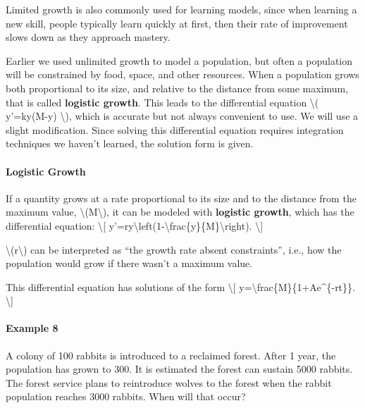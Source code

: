 Limited growth is also commonly used for learning models, since when
learning a new skill, people typically learn quickly at first, then
their rate of improvement slows down as they approach mastery.

Earlier we used unlimited growth to model a population, but often a
population will be constrained by food, space, and other resources. When
a population grows both proportional to its size, and relative to the
distance from some maximum, that is called \textbf{logistic growth}.
This leads to the differential equation \textbackslash{}( y'=ky(M-y)
\textbackslash{}), which is accurate but not always convenient to use.
We will use a slight modification. Since solving this differential
equation requires integration techniques we haven't learned, the
solution form is given.

\hypertarget{logistic-growth}{%
\paragraph{Logistic Growth}\label{logistic-growth}}

If a quantity grows at a rate proportional to its size and to the
distance from the maximum value, \textbackslash{}(M\textbackslash{}), it
can be modeled with \textbf{logistic growth}, which has the differential
equation: \textbackslash{}{[}
y'=ry\textbackslash{}left(1-\textbackslash{}frac\{y\}\{M\}\textbackslash{}right).
\textbackslash{}{]}

\textbackslash{}(r\textbackslash{}) can be interpreted as ``the growth
rate absent constraints'', i.e., how the population would grow if there
wasn't a maximum value.

This differential equation has solutions of the form \textbackslash{}{[}
y=\textbackslash{}frac\{M\}\{1+Ae\^{}\{-rt\}\}. \textbackslash{}{]}

\hypertarget{example-8}{%
\paragraph{Example 8}\label{example-8}}

A colony of 100 rabbits is introduced to a reclaimed forest. After 1
year, the population has grown to 300. It is estimated the forest can
sustain 5000 rabbits. The forest service plans to reintroduce wolves to
the forest when the rabbit population reaches 3000 rabbits. When will
that occur?

